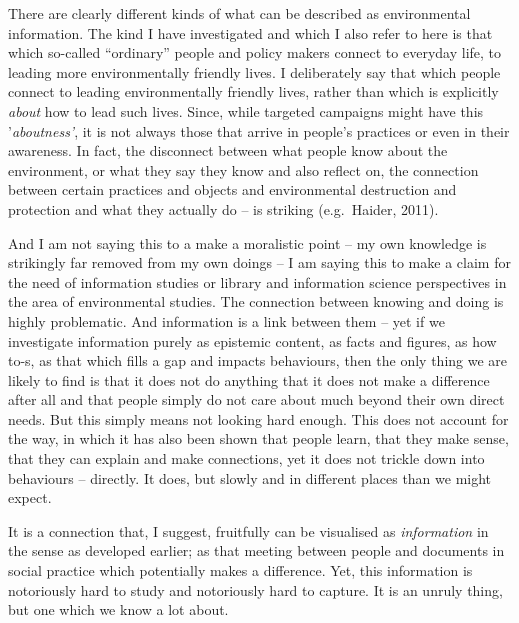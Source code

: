 ﻿\documentclass[a4paper,
fontsize=11pt,
oneside,
numbers=noperiodatend,
parskip=half-,
bibliography=totoc,
final
]{scrartcl}
\begin{document}
There are clearly different kinds of what can be described as
environmental information. The kind I have investigated and which I also
refer to here is that which so-called \enquote{ordinary} people and
policy makers connect to everyday life, to leading more environmentally
friendly lives. I deliberately say that which people connect to leading
environmentally friendly lives, rather than which is explicitly
\emph{about} how to lead such lives. Since, while targeted campaigns
might have this '\emph{aboutness'}, it is not always those that arrive
in people's practices or even in their awareness. In fact, the
disconnect between what people know about the environment, or what they
say they know and also reflect on, the connection between certain
practices and objects and environmental destruction and protection and
what they actually do -- is striking (e.g.~Haider, 2011).

And I am not saying this to a make a moralistic point -- my own
knowledge is strikingly far removed from my own doings -- I am saying
this to make a claim for the need of information studies or library and
information science perspectives in the area of environmental studies.
The connection between knowing and doing is highly problematic. And
information is a link between them -- yet if we investigate information
purely as epistemic content, as facts and figures, as how to-s, as that
which fills a gap and impacts behaviours, then the only thing we are
likely to find is that it does not do anything that it does not make a
difference after all and that people simply do not care about much
beyond their own direct needs. But this simply means not looking hard
enough. This does not account for the way, in which it has also been
shown that people learn, that they make sense, that they can explain and
make connections, yet it does not trickle down into behaviours --
directly. It does, but slowly and in different places than we might
expect.

It is a connection that, I suggest, fruitfully can be visualised as
\emph{information} in the sense as developed earlier; as that meeting
between people and documents in social practice which potentially makes
a difference. Yet, this information is notoriously hard to study and
notoriously hard to capture. It is an unruly thing, but one which we
know a lot about.
\end{document}
